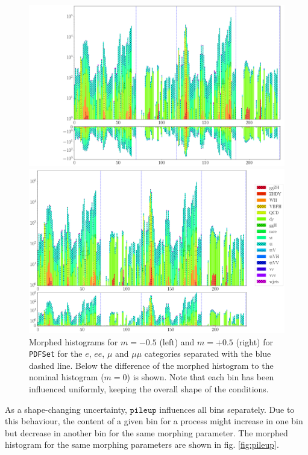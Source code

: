 \begin{figure}[h!]
	\centering
	\begin{minipage}{.5\textwidth}
		\centering
		\includegraphics[width=\linewidth]{figures/network_setup/PDFSet_-0.5}
	\end{minipage}%
	\begin{minipage}{.5\textwidth}
		\centering
		\includegraphics[width=\linewidth]{figures/network_setup/PDFSet_+0.5}
	\end{minipage}
	\caption{Morphed histograms for $m = -0.5$ (left) and $m = +0.5$ (right) for \texttt{PDFSet} for the $e$, $ee$, $\mu$ and $\mu\mu$ categories separated with the blue dashed line. Below the difference of the morphed histogram to the nominal histogram ($m = 0$) is shown. Note that each bin has been influenced uniformly, keeping the overall shape of the conditions.}
	\label{fig:pdfset}
\end{figure}

As a shape-changing uncertainty, $\texttt{pileup}$ influences all bins separately. Due to this behaviour, the content of a given bin for a process might increase in one bin but decrease in another bin for the same morphing parameter. The morphed histogram for the same morphing parameters are shown in fig. \ref{fig:pileup}.

